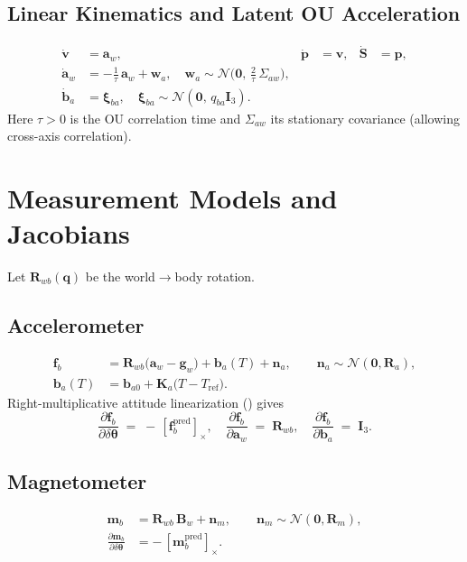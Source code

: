 \documentclass[11pt]{article}
\newcommand{\vect}[1]{\bm{#1}}
\newcommand{\mat}[1]{\bm{#1}}
\newcommand{\quat}[1]{\mathbf{#1}}
\newcommand{\I}{\mat{I}}
\newcommand{\skew}[1]{\left[ #1 \right]_\times}
\begin{document}
\subsection{Linear Kinematics and Latent OU Acceleration}
\begin{align}
  \dot{\vect{v}} &= \vect{a}_w, &
  \dot{\vect{p}} &= \vect{v}, &
  \dot{\vect{S}} &= \vect{p},
  \label{eq:lin-chain}\\
  \dot{\vect{a}}_w &= -\tfrac{1}{\tau}\,\vect{a}_w + \vect{w}_a, \quad
  \vect{w}_a \sim \mathcal{N}\!\bigl(\vect{0},\, \tfrac{2}{\tau}\,\Sigma_{aw}\bigr),
  \label{eq:ou-ct}\\
  \dot{\vect{b}}_a &= \vect{\xi}_{ba}, \quad \vect{\xi}_{ba} \sim \mathcal{N}(\vect{0},\, q_{ba}\I_3).
  \label{eq:ba-ct}
\end{align}
Here \(\tau>0\) is the OU correlation time and \(\Sigma_{aw}\) its stationary covariance
(allowing cross-axis correlation).

\section{Measurement Models and Jacobians}
\label{sec:meas}
Let \(\mat{R}_{wb}(\quat{q})\) be the world\(\to\)body rotation.

\subsection{Accelerometer}
\begin{align}
  \vect{f}_b &= \mat{R}_{wb}\bigl(\vect{a}_w - \vect{g}_w\bigr) + \vect{b}_a(T) + \vect{n}_a,
  \qquad \vect{n}_a \sim \mathcal{N}(\vect{0},\mat{R}_a),
  \label{eq:acc-meas}\\
  \vect{b}_a(T) &= \vect{b}_{a0} + \mat{K}_a \bigl(T - T_{\mathrm{ref}}\bigr).
  \label{eq:ba-temp}
\end{align}
Right-multiplicative attitude linearization () gives
\begin{equation}
  \frac{\partial \vect{f}_b}{\partial \delta\vect{\theta}}
  \;=\; -\,\skew{\vect{f}_b^{\mathrm{pred}}}, \quad
  \frac{\partial \vect{f}_b}{\partial \vect{a}_w} \;=\; \mat{R}_{wb}, \quad
  \frac{\partial \vect{f}_b}{\partial \vect{b}_a} \;=\; \I_3.
  \label{eq:acc-jacs}
\end{equation}

\subsection{Magnetometer}
\begin{align}
  \vect{m}_b &= \mat{R}_{wb}\,\vect{B}_w + \vect{n}_m, \qquad
  \vect{n}_m \sim \mathcal{N}(\vect{0},\mat{R}_m),
  \label{eq:mag-meas}\\
  \frac{\partial \vect{m}_b}{\partial \delta\vect{\theta}}
  &= -\,\skew{\vect{m}_b^{\mathrm{pred}}}.
  \label{eq:mag-jac}
\end{align}
\end{document}
